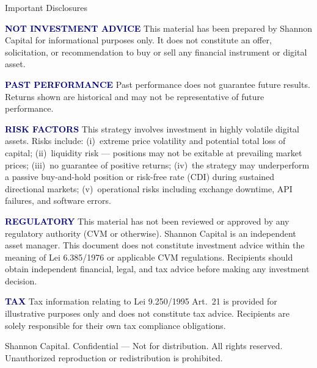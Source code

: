 \documentclass[aspectratio=169,10pt]{beamer}
\begin{document}
\begin{frame}[allowframebreaks]{Important Disclosures}
\scriptsize
\color{BodyText}
\setlength{\parskip}{0.5em}

\textcolor{Navy}{\textbf{NOT INVESTMENT ADVICE}} \quad
This material has been prepared by Shannon Capital for informational purposes
only. It does not constitute an offer, solicitation, or recommendation to buy
or sell any financial instrument or digital asset.

\textcolor{Navy}{\textbf{PAST PERFORMANCE}} \quad
Past performance does not guarantee future results. Returns shown are historical
and may not be representative of future performance.

\textcolor{Navy}{\textbf{RISK FACTORS}} \quad
This strategy involves investment in highly volatile digital assets. Risks
include: (i)~extreme price volatility and potential total loss of capital;
(ii)~liquidity risk --- positions may not be exitable at prevailing market
prices; (iii)~no guarantee of positive returns; (iv)~the strategy may
underperform a passive buy-and-hold position or risk-free rate (CDI) during
sustained directional markets; (v)~operational risks including exchange
downtime, API failures, and software errors.

\textcolor{Navy}{\textbf{REGULATORY}} \quad
This material has not been reviewed or approved by any regulatory authority
(CVM or otherwise). Shannon Capital is an independent asset manager. This
document does not constitute investment advice within the meaning of Lei
6.385/1976 or applicable CVM regulations. Recipients should obtain independent
financial, legal, and tax advice before making any investment decision.

\textcolor{Navy}{\textbf{TAX}} \quad
Tax information relating to Lei 9.250/1995 Art.~21 is provided for illustrative
purposes only and does not constitute tax advice. Recipients are solely
responsible for their own tax compliance obligations.

\vspace{0.3em}
{\color{MutedText}\textcopyright{} Shannon Capital. Confidential ---
Not for distribution. All rights reserved. Unauthorized reproduction or
redistribution is prohibited.}

\end{frame}
\end{document}
